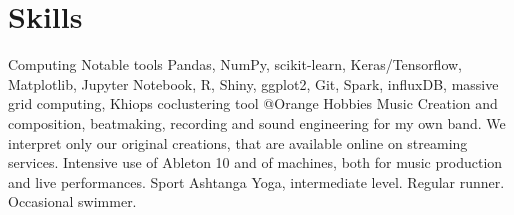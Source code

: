 \documentclass[]{friggeri-cv}
\begin{document}

\section{Skills}
\begin{entrylist}
  \entry
    {Computing}
    {Notable tools}
    {}
    {Pandas, NumPy, scikit-learn, Keras/Tensorflow, Matplotlib, Jupyter Notebook, R, Shiny, ggplot2, Git, Spark, influxDB, massive grid computing, Khiops coclustering tool @Orange}
  \entry
    {Hobbies}
    {Music}
    {}
    {Creation and composition, beatmaking, recording and sound engineering for my own band. We interpret only our original creations, that are available online on streaming services. Intensive use of Ableton 10 and of machines, both for music production and live performances.}
  \entry
    {}
    {Sport}
    {}
    {Ashtanga Yoga, intermediate level. Regular runner. Occasional swimmer.}
\end{entrylist}
\end{document}
